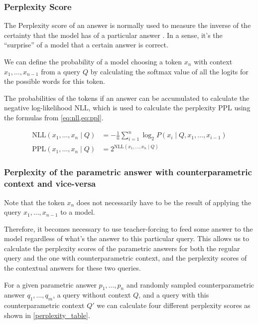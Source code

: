 \subsubsection{Perplexity Score}
\newcommand{\NLL}{\text{NLL}}
\newcommand{\PPL}{\text{PPL}}

The Perplexity score of an answer is normally used to measure the inverse of the certainty that the model has of a particular answer \citep{gpt3,retro}.
In a sense, it's the ``surprise'' of a model that a certain answer is correct.

We can define the probability of a model choosing a token $x_n$ with context $x_1, \dots, x_{n - 1}$ from a query $Q$ by calculating the softmax value of all the logits for the possible words for this token.

The probabilities of the tokens if an answer can be accumulated to calculate the negative log-likelihood $\NLL$, which is used to calculate the perplexity $\PPL$ using the formulas from \cref{eq:nll,eq:ppl}.

\begin{align}
	\NLL \left( x_1, \dots, x_n \mid Q \right) &= - \frac{1}{n} \sum^n_{i = 1} \log_2 P \left( x_i \mid Q, x_1, \dots, x_{i - 1} \right) \label{eq:nll} \\[1ex]
	\PPL \left( x_1, \dots, x_n \mid Q \right) &= {2 ^ {\text{NLL} \left( x_1, \dots, x_n \mid Q \right)}} \label{eq:ppl}
\end{align}


\subsubsection{Perplexity of the parametric answer with counterparametric context and vice-versa}

Note that the token $x_n$ does not necessarily have to be the result of applying the query $x_1, \dots, x_{n - 1}$ to a model.

Therefore, it becomes necessary to use teacher-forcing \citep{teacher_forcing} to feed some answer to the model regardless of what's the answer to this particular query. This allows us to calculate the perplexity scores of the parametric answers for both the regular query and the one with counterparametric context, and the perplexity scores of the contextual answers for these two queries.

For a given parametric answer $p_1, \dots, p_n$ and randomly sampled counterparametric answer $q_1, \dots, q_m$, a query without context $Q$, and a query with this counterparametric context $Q'$ we can calculate four different perplexity scores as shown in \cref{perplexity_table}.


